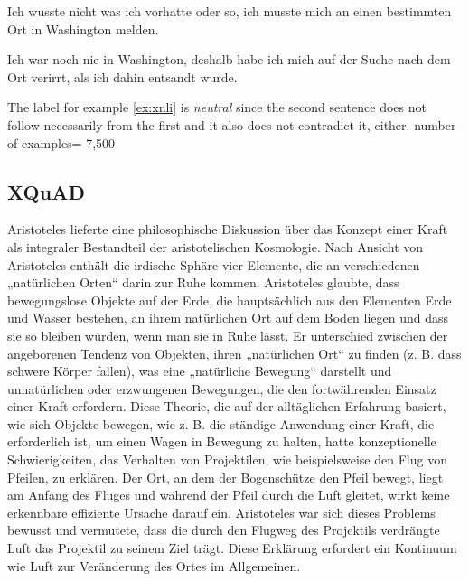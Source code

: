 \begin{examples}
	\label{ex:xnli}
	\item Ich wusste nicht was ich vorhatte oder so, ich musste mich an einen bestimmten Ort in Washington melden.

        Ich war noch nie in Washington, deshalb habe ich mich auf der Suche nach dem Ort verirrt, als ich dahin entsandt wurde.
\end{examples}

The label for example \ref{ex:xnli} is \emph{neutral} since the second sentence does not follow necessarily from the first and it also does not contradict it, either.
number of examples= 7,500

\subsection{XQuAD}

\begin{examples}
	\label{ex:xquad}
	\item Aristoteles lieferte eine philosophische Diskussion über das Konzept einer Kraft als integraler Bestandteil der aristotelischen Kosmologie. Nach Ansicht von Aristoteles enthält die irdische Sphäre vier Elemente, die an verschiedenen „natürlichen Orten“ darin zur Ruhe kommen. Aristoteles glaubte, dass bewegungslose Objekte auf der Erde, die hauptsächlich aus den Elementen Erde und Wasser bestehen, an ihrem natürlichen Ort auf dem Boden liegen und dass sie so bleiben würden, wenn man sie in Ruhe lässt. Er unterschied zwischen der angeborenen Tendenz von Objekten, ihren „natürlichen Ort“ zu finden (z. B. dass schwere Körper fallen), was eine „natürliche Bewegung“ darstellt und unnatürlichen oder erzwungenen Bewegungen, die den fortwährenden Einsatz einer Kraft erfordern. Diese Theorie, die auf der alltäglichen Erfahrung basiert, wie sich Objekte bewegen, wie z. B. die ständige Anwendung einer Kraft, die erforderlich ist, um einen Wagen in Bewegung zu halten, hatte konzeptionelle Schwierigkeiten, das Verhalten von Projektilen, wie beispielsweise den Flug von Pfeilen, zu erklären. Der Ort, an dem der Bogenschütze den Pfeil bewegt, liegt am Anfang des Fluges und während der Pfeil durch die Luft gleitet, wirkt keine erkennbare effiziente Ursache darauf ein. Aristoteles war sich dieses Problems bewusst und vermutete, dass die durch den Flugweg des Projektils verdrängte Luft das Projektil zu seinem Ziel trägt. Diese Erklärung erfordert ein Kontinuum wie Luft zur Veränderung des Ortes im Allgemeinen.
\end{examples}

